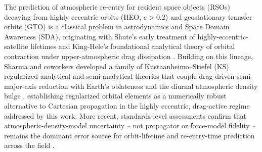 %

The prediction of atmospheric re-entry for resident space objects (RSOs)
decaying from highly eccentric orbits (HEO, $e>0.2$) and geostationary
transfer orbits (GTO) is a classical problem in astrodynamics and Space
Domain Awareness (SDA), originating with Shute's early treatment of
highly-eccentric-satellite lifetimes \cite{shute1965,shutechiville1966}
and King-Hele's foundational analytical theory of orbital contraction
under upper-atmospheric drag dissipation \cite{kinghele1987}. Building on
this lineage, Sharma and coworkers developed a family of
Kustaanheimo--Stiefel (KS) regularized analytical and semi-analytical
theories that couple drag-driven semi-major-axis reduction with Earth's
oblateness \cite{sharmaraj1988,sharma1997} and the diurnal atmospheric
density bulge \cite{swinerdboulton1983}, establishing regularized orbital
elements as a numerically robust alternative to Cartesian propagation in
the highly eccentric, drag-active regime addressed by this work. More
recent, standards-level assessments confirm that atmospheric-density-model
uncertainty -- not propagator or force-model fidelity -- remains the
dominant error source for orbit-lifetime and re-entry-time prediction
across the field \cite{vallado2014,iso27852}.

